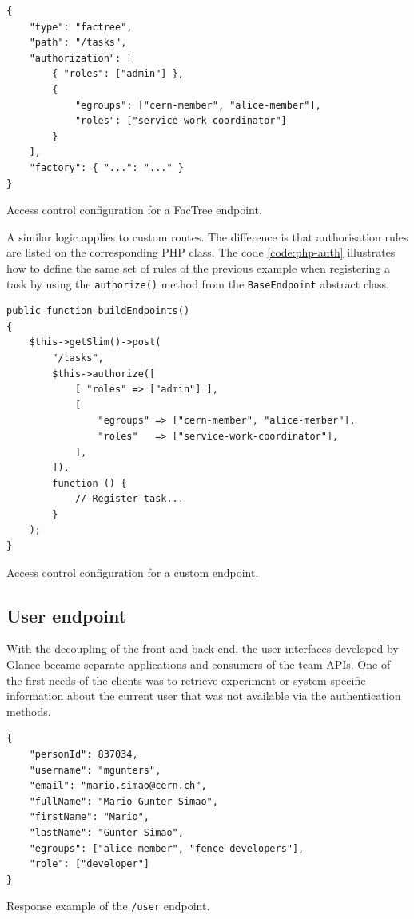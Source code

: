 \begin{listing}[htbp]
\begin{verbatim}
{
    "type": "factree",
    "path": "/tasks",
    "authorization": [
        { "roles": ["admin"] },
        {
	        "egroups": ["cern-member", "alice-member"],
	        "roles": ["service-work-coordinator"]
	    }
    ],
    "factory": { "...": "..." }
}
\end{verbatim}
\caption{Access control configuration for a FacTree endpoint.}
\label{code:factree-auth}
\end{listing}

A similar logic applies to custom routes. The difference is that authorisation rules are listed on the corresponding PHP class. The code \autoref{code:php-auth} illustrates how to define the same set of rules of the previous example when registering a task by using the \texttt{authorize()} method from the \texttt{BaseEndpoint} abstract class.

\begin{listing}[htbp]
\begin{verbatim}
public function buildEndpoints()
{
    $this->getSlim()->post(
        "/tasks",
        $this->authorize([
            [ "roles" => ["admin"] ],
            [
                "egroups" => ["cern-member", "alice-member"],
                "roles"   => ["service-work-coordinator"],
            ],
        ]),
        function () {
            // Register task...
        }
    );
}
\end{verbatim}
\caption{Access control configuration for a custom endpoint.}
\label{code:php-auth}
\end{listing}

\subsection{User endpoint}

With the decoupling of the front and back end, the user interfaces developed by Glance became separate applications and consumers of the team APIs. One of the first needs of the clients was to retrieve experiment or system-specific information about the current user that was not available via the authentication methods. 

\begin{listing}[htbp]
\begin{verbatim}
{
	"personId": 837034,
	"username": "mgunters",
	"email": "mario.simao@cern.ch",
	"fullName": "Mario Gunter Simao",
	"firstName": "Mario",
	"lastName": "Gunter Simao",
	"egroups": ["alice-member", "fence-developers"],
	"role": ["developer"]
}
\end{verbatim}
\caption{Response example of the \texttt{/user} endpoint.}
\label{code:user-endpoint-response}
\end{listing}


